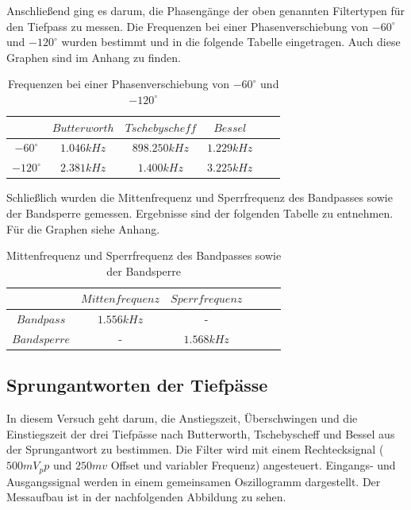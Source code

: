 \noindent Anschließend ging es darum, die Phasengänge der oben genannten Filtertypen für den Tiefpass zu messen. Die Frequenzen bei einer Phasenverschiebung von $-60^\circ$ und $-120^\circ$ wurden bestimmt und in die folgende Tabelle eingetragen. Auch diese Graphen sind im Anhang zu finden.

\begin{table}[h]
	\centering
		\begin{tabular}{c|c|c|c|c|c}
			$ $           & $Butterworth$ & $Tschebyscheff$ & $Bessel$  \\
			\hline		
		    $-60^\circ $ & $1.046kHz$    & $898.250kHz$    & $1.229kHz$  \\
			$-120^\circ$ & $2.381kHz$    & $1.400kHz$      & $3.225kHz$  \\   
	\end{tabular}
	\caption{Frequenzen bei einer Phasenverschiebung von $-60^\circ$ und $-120^\circ$ }
	\label{tab:phasenverschiebung_hp_tp}
\end{table}
	
\noindent Schließlich wurden die Mittenfrequenz und Sperrfrequenz des Bandpasses sowie der Bandsperre gemessen. Ergebnisse sind der folgenden Tabelle zu entnehmen. Für die Graphen siehe Anhang.

\begin{table}[h]
	\centering
	\begin{tabular}{c|c|c|c|c|c}
		$ $          & $Mittenfrequenz$ & $Sperrfrequenz$  \\
		\hline
		$Bandpass$   & $1.556kHz$       & -         \\
		$Bandsperre$ & -              & $1.568kHz$  \\   
	\end{tabular}
	\caption{Mittenfrequenz und Sperrfrequenz des Bandpasses sowie der Bandsperre}
	\label{tab:grenzfrequnzen_bs_bp}
\end{table}

\newpage

\subsection{Sprungantworten der Tiefpässe}
\noindent In diesem Versuch geht darum, die Anstiegszeit, Überschwingen und die Einstiegszeit der drei Tiefpässe nach Butterworth, Tschebyscheff und Bessel aus der Sprungantwort zu bestimmen. Die Filter wird mit einem Rechtecksignal ($500mV_pp$ und $250mv$ Offset und variabler Frequenz) angesteuert. Eingangs- und Ausgangssignal werden in einem gemeinsamen Oszillogramm dargestellt. Der Messaufbau ist in der nachfolgenden Abbildung zu sehen.

